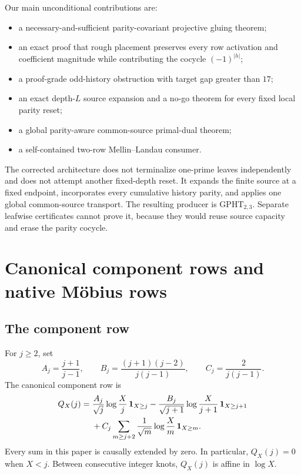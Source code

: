 \documentclass[11pt]{article}
\newcommand{\1}{\mathbf 1}
\newcommand{\GPHT}{\mathrm{GPHT}_{2,3}}
\begin{document}
Our main unconditional contributions are:

\begin{itemize}
\item a necessary-and-sufficient parity-covariant projective gluing theorem;
\item an exact proof that rough placement preserves every row activation and
coefficient magnitude while contributing the cocycle $(-1)^{|h|}$;
\item a proof-grade odd-history obstruction with target gap greater than $17$;
\item an exact depth-$L$ source expansion and a no-go theorem for every fixed
local parity reset;
\item a global parity-aware common-source primal-dual theorem;
\item a self-contained two-row Mellin--Landau consumer.
\end{itemize}

The corrected architecture does not terminalize one-prime leaves independently
and does not attempt another fixed-depth reset.  It expands the finite source at
a fixed endpoint, incorporates every cumulative history parity, and applies one
global common-source transport.  The resulting producer is $\GPHT$.  Separate
leafwise certificates cannot prove it, because they would reuse source capacity
and erase the parity cocycle.

\section{Canonical component rows and native M\"obius rows}

\subsection{The component row}

For $j\ge2$, set
\[
 A_j=\frac{j+1}{j-1},\qquad
 B_j=\frac{(j+1)(j-2)}{j(j-1)},\qquad
 C_j=\frac{2}{j(j-1)}.
\]
The canonical component row is
\begin{align}
 Q_X(j)={}&
 \frac{A_j}{\sqrt j}\log\frac Xj\,\1_{X\ge j}
 -\frac{B_j}{\sqrt{j+1}}\log\frac X{j+1}\,\1_{X\ge j+1}
 \notag\\
 &+C_j\sum_{m\ge j+2}
 \frac1{\sqrt m}\log\frac Xm\,\1_{X\ge m}.
 \label{eq:Q}
\end{align}
Every sum in this paper is causally extended by zero.  In particular,
$Q_X(j)=0$ when $X<j$.  Between consecutive integer knots, $Q_X(j)$ is affine
in $\log X$.
\end{document}
